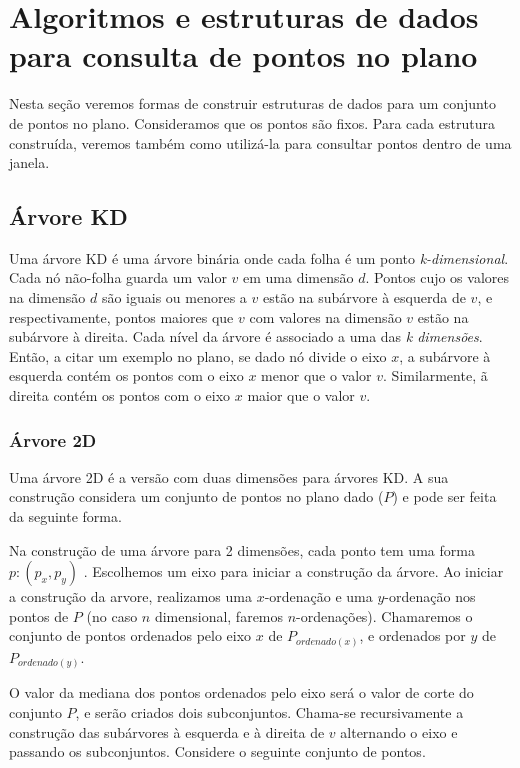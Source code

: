 \chapter{Algoritmos e estruturas de dados para consulta de pontos no plano}\label{cap:desenvolvimento}
Nesta seção veremos formas de construir estruturas de dados para um conjunto de pontos no plano. 
Consideramos que os pontos são fixos. Para cada estrutura construída, veremos também como utilizá-la para
consultar pontos dentro de uma janela.

\section{Árvore KD}

Uma árvore KD é uma árvore binária onde cada folha é um ponto \textit{k-dimensional}.
Cada nó não-folha guarda um valor $v$ em uma dimensão $d$.
Pontos cujo os valores na dimensão $d$ são iguais ou menores a $v$ estão na subárvore à esquerda de $v$,
e respectivamente, pontos maiores que $v$ com valores na dimensão $v$ estão na subárvore à direita.
Cada nível da árvore é associado a uma das \textit{k dimensões}. Então, a citar um exemplo no plano, se dado nó
 divide o eixo
$x$, a subárvore à esquerda contém os pontos com o eixo $x$ menor que o valor $v$. Similarmente,
 ã direita contém os pontos com o eixo $x$ maior que o valor $v$.

\subsection{Árvore 2D}
Uma árvore 2D é a versão com duas dimensões para árvores KD. A sua construção considera um conjunto 
de pontos no plano dado ($P$) e pode ser feita da seguinte forma.

Na construção de uma árvore para 2 dimensões, cada ponto tem uma forma $p : (p_x, p_y)$ .
Escolhemos um eixo para iniciar a construção da árvore. Ao iniciar a construção da arvore,
realizamos uma $x$-ordenação e uma $y$-ordenação nos pontos de $P$ (no caso $n$ dimensional, faremos
$n$-ordenações). Chamaremos o conjunto de pontos ordenados pelo eixo $x$ de $P_{ordenado(x)}$, e ordenados por $y$ de 
$P_{ordenado(y)}$.

O valor da mediana dos pontos ordenados pelo eixo será o valor de corte do conjunto $P$,
e serão criados dois subconjuntos.\cite{cg08} 
Chama-se recursivamente a construção das subárvores à esquerda e à direita de $v$ alternando o eixo 
e passando os subconjuntos. Considere o seguinte conjunto de pontos.

